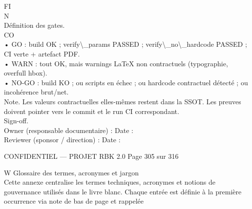 \documentclass[12pt,landscape,a4paper]{article}
\newenvironment{confidential}
{\begin{tcolorbox}[
    colback=rbkred!5!white,
    colframe=rbkred!75!black,
    title=CONFIDENTIEL,
    fonttitle=\bfseries\color{white},
    coltitle=rbkred!75!black,
    breakable,
    enhanced,
    frame hidden,
    borderline west={2pt}{0pt}{rbkred!75!black}
]}
{\end{tcolorbox}}
\begin{document}
\vspace{0.5em}
\vspace{0.5em}
FI\\
N\\
Définition des gates.\\
CO\\
• GO : build OK ; verify\textbackslash{}_params PASSED ; verify\textbackslash{}_no\textbackslash{}_hardcode PASSED ; CI verte + artefact PDF.\\
\vspace{0.5em}
• WARN : tout OK, mais warnings LaTeX non contractuels (typographie, overfull hbox).\\
\vspace{0.5em}
• NO-GO : build KO ; ou scripts en échec ; ou hardcode contractuel détecté ; ou incohérence brut/net.\\
\vspace{0.5em}
\vspace{0.5em}
Note. Les valeurs contractuelles elles-mêmes restent dans la SSOT. Les preuves doivent pointer vers le commit et le run CI correspondant.\\
\vspace{0.5em}
Sign-off.\\
\vspace{0.5em}
Owner (responsable documentaire) :                                                                                                                            Date :\\
\vspace{0.5em}
Reviewer (sponsor / direction) :                                                                                                                             Date :\\
\vspace{0.5em}
\vspace{0.5em}
\vspace{0.5em}
\vspace{0.5em}
\begin{confidential}CONFIDENTIEL — PROJET RBK 2.0                                                             Page 305 sur 316\end{confidential}
W \textbar{} Glossaire des termes, acronymes et jargon\\
\vspace{0.5em}
\vspace{0.5em}
Cette annexe centralise les termes techniques, acronymes et notions de gouvernance utilisés dans le livre blanc. Chaque entrée est définie à la première occurrence via note de bas de page et rappelée\\
\end{document}
